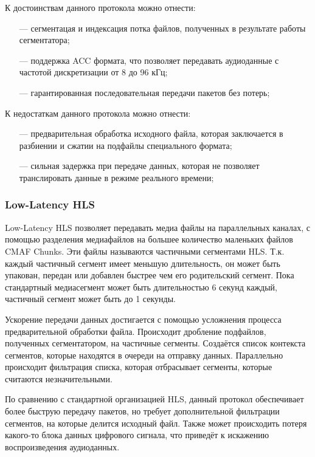 		\par К достоинствам данного протокола можно отнести:
		\begin{itemize}[leftmargin=1.6\parindent]
			\item[---] сегментацая и индексация потка файлов, полученных в результате работы сегментатора;
			\item[---] поддержка ACC формата, что позволяет передавать аудиоданные с частотой дискретизации от 8 до 96 кГц;
			\item[---] гарантированная последовательная передачи пакетов без потерь;
		\end{itemize}

		\par К недостаткам данного протокола можно отнести:
		\begin{itemize}[leftmargin=1.6\parindent]
			\item[---] предварительная обработка исходного файла, которая заключается в разбиении и сжатии на подфайлы специального формата;
			\item[---] сильная задержка при передаче данных, которая не позволяет транслировать данные в режиме реального времени;
		\end{itemize}

	\subsubsection{Low-Latency HLS}

		\par Low-Latency HLS \cite{hls-ll} позволяет передавать медиа файлы на параллельных каналах, с помощью разделения медиафайлов на большее количество маленьких файлов CMAF Chunks. 
		Эти файлы называются частичными сегментами HLS. 
		Т.к. каждый частичный сегмент имеет меньшую длительность, он может быть упакован, передан или добавлен быстрее чем его родительский сегмент.
		Пока стандартный медиасегмент может быть длительностью 6 секунд каждый, частичный сегмент может быть до 1 секунды.

		\par Ускорение передачи данных достигается с помощью усложнения процесса предварительной обработки файла. 
		Происходит дробление подфайлов, полученных сегментатором, на частичные сегменты. 
		Создаётся список контекста сегментов, которые находятся в очереди на отправку данных.
		Параллельно происходит фильтрация списка, которая отбрасывает сегменты, которые считаются незначительными.

		\par По сравнению с стандартной организацией HLS, данный протокол обеспечивает более быструю передачу пакетов, 
		но требует дополнительной фильтрации сегментов, на которые делится исходный файл. 
		Также может происходить потеря какого-то блока данных цифрового сигнала, что приведёт к искажению воспроизведения аудиоданных.


